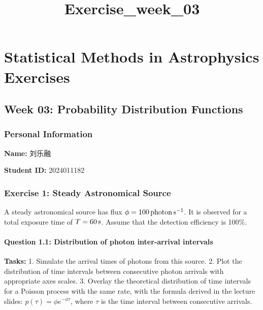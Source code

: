 \documentclass[11pt]{article}
\title{Exercise\_week\_03}
\begin{document}
    
    \maketitle
    
    

    
    \section{Statistical Methods in Astrophysics
Exercises}\label{statistical-methods-in-astrophysics-exercises}

\subsection{Week 03: Probability Distribution
Functions}\label{week-03-probability-distribution-functions}

\subsubsection{Personal Information}\label{personal-information}

\textbf{Name:} 刘乐融

\textbf{Student ID:} 2024011182

    \subsubsection{Exercise 1: Steady Astronomical
Source}\label{exercise-1-steady-astronomical-source}

A steady astronomical source has flux
\(\phi = 100\,{\rm photon}\,{\rm s}^{-1}\). It is observed for a total
exposure time of \(T = 60\,{\rm s}\). Assume that the detection
efficiency is 100\%.

\paragraph{Question 1.1: Distribution of photon inter-arrival
intervals}\label{question-1.1-distribution-of-photon-inter-arrival-intervals}

\textbf{Tasks:} 1. Simulate the arrival times of photons from this
source. 2. Plot the distribution of time intervals between consecutive
photon arrivals with appropriate axes scales. 3. Overlay the theoretical
distribution of time intervals for a Poisson process with the same rate,
with the formula derived in the lecture slides:
\(p(\tau) = \phi e^{-\phi \tau}\), where \(\tau\) is the time interval
between consecutive arrivals.
\end{document}
